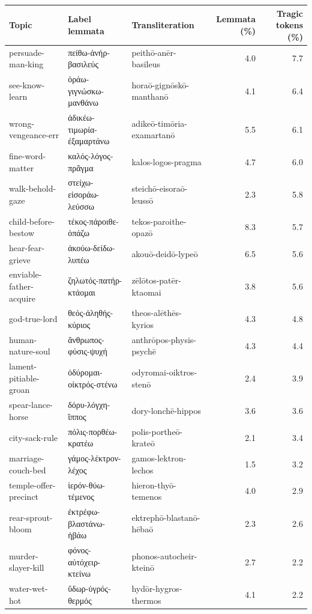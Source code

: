\begin{table}[htbp]
\centering
\footnotesize
\begin{tabularx}{\textwidth}{XXXrr}
\toprule
Topic & Label lemmata & Transliteration & Lemmata (\%) & Tragic tokens (\%) \\
\midrule
persuade-man-king & πείθω-ἀνήρ-βασιλεύς & peithō-anēr-basileus & 4.0 & 7.7 \\
see-know-learn & ὁράω-γιγνώσκω-μανθάνω & horaō-gignōskō-manthanō & 4.1 & 6.4 \\
wrong-vengeance-err & ἀδικέω-τιμωρία-ἐξαμαρτάνω & adikeō-timōria-examartanō & 5.5 & 6.1 \\
fine-word-matter & καλός-λόγος-πρᾶγμα & kalos-logos-pragma & 4.7 & 6.0 \\
walk-behold-gaze & στείχω-εἰσοράω-λεύσσω & steichō-eisoraō-leussō & 2.3 & 5.8 \\
child-before-bestow & τέκος-πάροιθε-ὀπάζω & tekos-paroithe-opazō & 8.3 & 5.7 \\
hear-fear-grieve & ἀκούω-δείδω-λυπέω & akouō-deidō-lypeō & 6.5 & 5.6 \\
enviable-father-acquire & ζηλωτός-πατήρ-κτάομαι & zēlōtos-patēr-ktaomai & 3.8 & 5.6 \\
god-true-lord & θεός-ἀληθής-κύριος & theos-alēthēs-kyrios & 4.3 & 4.8 \\
human-nature-soul & ἄνθρωπος-φύσις-ψυχή & anthrōpos-physis-psychē & 4.3 & 4.4 \\
lament-pitiable-groan & ὀδύρομαι-οἰκτρός-στένω & odyromai-oiktros-stenō & 2.4 & 3.9 \\
spear-lance-horse & δόρυ-λόγχη-ἵππος & dory-lonchē-hippos & 3.6 & 3.6 \\
city-sack-rule & πόλις-πορθέω-κρατέω & polis-portheō-krateō & 2.1 & 3.4 \\
marriage-couch-bed & γάμος-λέκτρον-λέχος & gamos-lektron-lechos & 1.5 & 3.2 \\
temple-offer-precinct & ἱερόν-θύω-τέμενος & hieron-thyō-temenos & 4.0 & 2.9 \\
rear-sprout-bloom & ἐκτρέφω-βλαστάνω-ἡβάω & ektrephō-blastanō-hēbaō & 2.3 & 2.6 \\
murder-slayer-kill & φόνος-αὐτόχειρ-κτείνω & phonos-autocheir-kteinō & 2.7 & 2.2 \\
water-wet-hot & ὕδωρ-ὑγρός-θερμός & hydōr-hygros-thermos & 4.1 & 2.2 \\

\end{tabularx}
\end{table}
